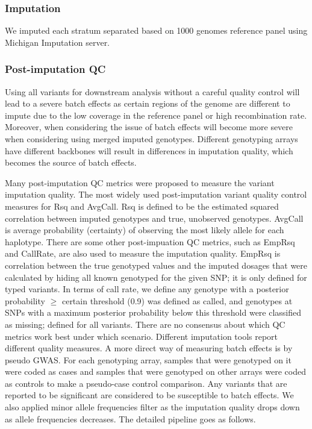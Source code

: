 \documentclass[12pt]{amsart}
\begin{document}
\subsubsection{Imputation}
We imputed each stratum separated based on 1000 genomes reference panel using Michigan Imputation server. 

\subsubsection{Post-imputation QC}
Using all variants for downstream analysis without a careful quality control will lead to a severe batch effects as certain regions of the genome are different to impute due to the low coverage in the reference panel or high recombination rate. Moreover, when considering the issue of batch effects will become more severe when considering using merged imputed genotypes. Different genotyping arrays have different backbones will result in differences in imputation quality, which becomes the source of batch effects. 

Many post-imputation QC metrics were proposed to measure the variant imputation quality. The most widely used post-imputation variant quality control measures for Rsq and AvgCall. Rsq is defined to be the estimated squared correlation between imputed genotypes and true, unobserved genotypes. AvgCall is average probability (certainty) of observing the most likely allele for each haplotype. There are some other post-impuation QC metrics, such as EmpRsq and CallRate, are also used to measure the imputation quality. EmpRsq is correlation between the true genotyped values and the imputed dosages that were calculated by hiding all known genotyped for the given SNP; it is only defined for typed variants. In terms of call rate, we define any genotype with a posterior probability $\geq$ certain threshold (0.9) was defined as called, and genotypes at SNPs with a maximum posterior probability below this threshold were classified as missing; defined for all variants. There are no consensus about which QC metrics work best under which scenario. Different imputation tools report different quality measures. A more direct way of measuring batch effects is by pseudo GWAS. For each genotyping array, samples that were genotyped on it were coded as cases and samples that were genotyped on other arrays were coded as controls to make a pseudo-case control comparison. Any variants that are reported to be significant are considered to be susceptible to batch effects. We also applied minor allele frequencies filter as the imputation quality drops down as allele frequencies decreases. The detailed pipeline goes as follows.
\end{document}
